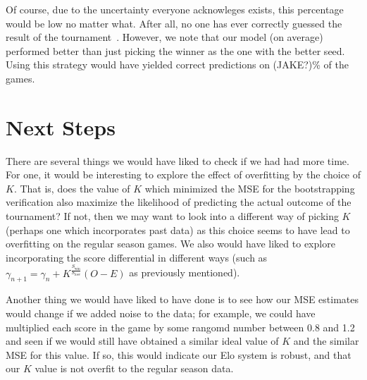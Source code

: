 \documentclass{article}
\begin{document}
Of course, due to the uncertainty everyone acknowleges exists, this percentage would be low no matter what. After all, no one has ever correctly guessed the result of the tournament~\cite{cbsnewsAnyoneEver}. However, we note that our model (on average) performed better than just picking the winner as the one with the better seed. Using this strategy would have yielded correct predictions on (JAKE?)\% of the games.



\section{Next Steps}\label{nextSteps}


There are several things we would have liked to check if we had had more time. For one, it would be interesting to explore the effect of overfitting by the choice of $K$. That is, does the value of $K$ which minimized the MSE for the bootstrapping verification also maximize the likelihood of predicting the actual outcome of the tournament? If not, then we may want to look into a different way of picking $K$ (perhaps one which incorporates past data) as this choice seems to have lead to overfitting on the regular season games. We also would have liked to explore incorporating the score differential in different ways (such as $\gamma_{n+1} = \gamma_n + K^{\frac{S_{\text{win}}}{S_{\text{lose}}}}(O - E)$ as previously mentioned).

Another thing we would have liked to have done is to see how our MSE estimates would change if we added noise to the data; for example, we could have multiplied each score in the game by some rangomd number between 0.8 and 1.2 and seen if we would still have obtained a similar ideal value of $K$ and the similar MSE for this value. If so, this would indicate our Elo system is robust, and that our $K$ value is not overfit to the regular season data.
\end{document}
